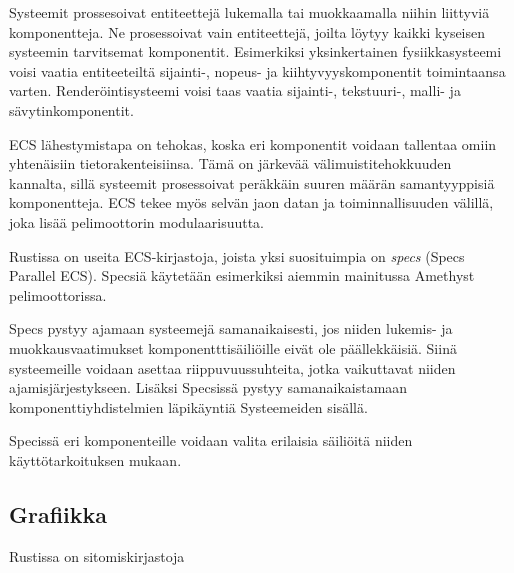 \documentclass[finnish]{tktltiki2}
\theoremstyle{definition}
\theoremstyle{remark}
\begin{document}
Systeemit prossesoivat entiteettejä lukemalla tai muokkaamalla niihin liittyviä komponentteja. Ne prosessoivat vain entiteettejä, joilta löytyy kaikki kyseisen systeemin tarvitsemat komponentit. Esimerkiksi yksinkertainen fysiikkasysteemi voisi vaatia entiteeteiltä sijainti-, nopeus- ja kiihtyvyyskomponentit toimintaansa varten. Renderöintisysteemi voisi taas vaatia sijainti-, tekstuuri-, malli- ja sävytinkomponentit.

ECS lähestymistapa on tehokas, koska eri komponentit voidaan tallentaa omiin yhtenäisiin tietorakenteisiinsa. Tämä on järkevää välimuistitehokkuuden kannalta, sillä systeemit prosessoivat peräkkäin suuren määrän samantyyppisiä komponentteja. ECS tekee myös selvän jaon datan ja toiminnallisuuden välillä, joka lisää pelimoottorin modulaarisuutta.

Rustissa on useita ECS-kirjastoja, joista yksi suosituimpia on \textit{specs} (Specs Parallel ECS)\cite{AreWeGameYetEcs}. Specsiä käytetään esimerkiksi aiemmin mainitussa Amethyst pelimoottorissa. 

Specs pystyy ajamaan systeemejä samanaikaisesti, jos niiden lukemis- ja muokkausvaatimukset komponentttisäiliöille eivät ole päällekkäisiä. Siinä systeemeille voidaan asettaa riippuvuussuhteita, jotka vaikuttavat niiden ajamisjärjestykseen. Lisäksi Specsissä pystyy samanaikaistamaan komponenttiyhdistelmien läpikäyntiä Systeemeiden sisällä.

Specissä eri komponenteille voidaan valita erilaisia säiliöitä niiden käyttötarkoituksen mukaan. 

\subsection{Grafiikka}

Rustissa on sitomiskirjastoja


% 



%
%
% 
%







% 
\end{document}
